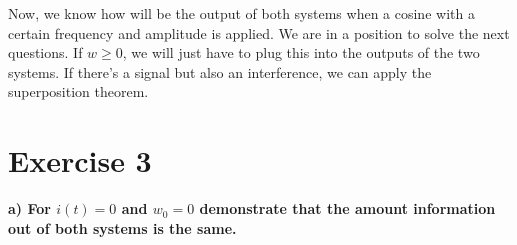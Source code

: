 
\noindent Now, we know how will be the output of both systems when a cosine with a certain frequency and amplitude is applied. We are in a position to solve the next questions. If $w \geq 0$, we will just have to plug this into the outputs of the two systems. If there's a signal but also an interference, we can apply the superposition theorem.


\section{Exercise 3}
\begin{pexbox}{}
    \textbf{a) For $i(t) = 0$ and $w_0 = 0$ demonstrate that the amount information out of both systems is the same.}
\end{pexbox}

